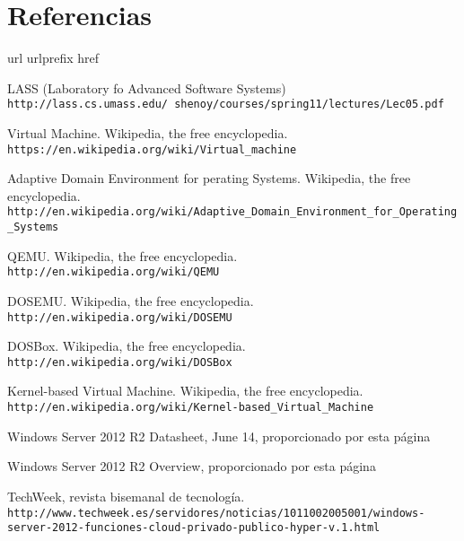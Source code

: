 \documentclass[paper=a4, fontsize=11pt]{scrartcl} %
\numberwithin{equation}{section} %
\numberwithin{figure}{section} %
\numberwithin{table}{section} %
\begin{document}
\section{Referencias}
\begin{thebibliography}{10}
\expandafter\ifx\csname url\endcsname\relax
  \def\url#1{\texttt{#1}}\fi
\expandafter\ifx\csname urlprefix\endcsname\relax\def\urlprefix{URL }\fi
\expandafter\ifx\csname href\endcsname\relax
  \def\href#1#2{#2} \def\path#1{#1}\fi

LASS (Laboratory fo Advanced Software Systems)
  \url{http://lass.cs.umass.edu/~shenoy/courses/spring11/lectures/Lec05.pdf}

Virtual Machine. Wikipedia, the free encyclopedia.\\
  \url{https://en.wikipedia.org/wiki/Virtual_machine}

Adaptive Domain Environment for perating Systems. Wikipedia, the free encyclopedia.\\
  \url{http://en.wikipedia.org/wiki/Adaptive_Domain_Environment_for_Operating_Systems}

QEMU. Wikipedia, the free encyclopedia.\\
  \url{http://en.wikipedia.org/wiki/QEMU}

DOSEMU. Wikipedia, the free encyclopedia.\\
  \url{http://en.wikipedia.org/wiki/DOSEMU}

DOSBox. Wikipedia, the free encyclopedia.\\
  \url{http://en.wikipedia.org/wiki/DOSBox}

Kernel-based Virtual Machine. Wikipedia, the free encyclopedia.\\
  \url{http://en.wikipedia.org/wiki/Kernel-based_Virtual_Machine}


Windows Server 2012 R2 Datasheet, June 14, proporcionado por
\href{http://www.microsoft.com/es-es/server-cloud/products/windows-server-2012-r2/}{esta página}

Windows Server 2012 R2 Overview, proporcionado por
\href{http://www.microsoft.com/es-es/server-cloud/products/windows-server-2012-r2/}{esta página}

TechWeek, revista bisemanal de tecnología.\\
  \url{http://www.techweek.es/servidores/noticias/1011002005001/windows-server-2012-funciones-cloud-privado-publico-hyper-v.1.html}


\end{thebibliography}
\end{document}

